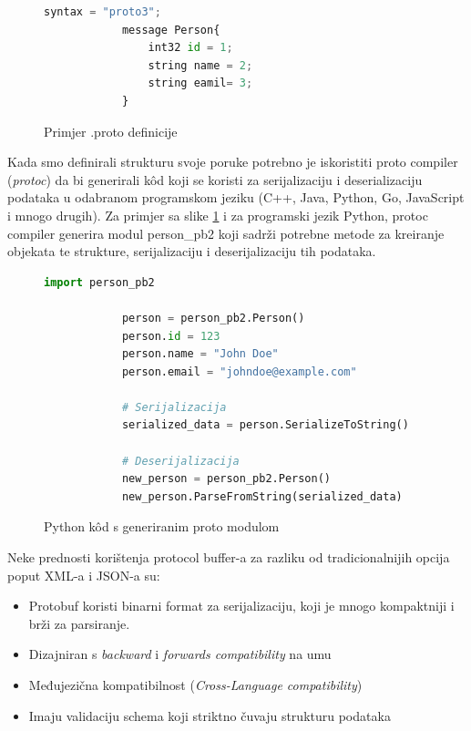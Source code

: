 \documentclass[zavrsnirad]{fer}
\begin{document}
\begin{figure}[H]
	\centering
	\begin{minipage}{0.6\linewidth}
		\begin{lstlisting}[language=Python]
			syntax = "proto3";
			message Person{
				int32 id = 1;
				string name = 2;
				string eamil= 3;
			}
		\end{lstlisting}
	\end{minipage}
	\caption{Primjer .proto definicije}
	\label{slk:proto}
\end{figure}		


Kada smo definirali strukturu svoje poruke potrebno je iskoristiti proto compiler (\textit{protoc}) da bi generirali k\^od koji se koristi za serijalizaciju i deserializaciju podataka u odabranom programskom jeziku (C++, Java, Python, Go, JavaScript i mnogo drugih). Za primjer sa slike \ref{slk:proto} i za programski jezik Python, protoc compiler generira modul person\_pb2 koji sadrži potrebne metode za kreiranje objekata te strukture, serijalizaciju i deserijalizaciju tih podataka. 

\begin{figure}[h]
	\centering
	\begin{minipage}{0.8\linewidth}
		\begin{lstlisting}[language=Python]
			import person_pb2
			
			person = person_pb2.Person()
			person.id = 123
			person.name = "John Doe"
			person.email = "johndoe@example.com"
			
			# Serijalizacija
			serialized_data = person.SerializeToString()
			
			# Deserijalizacija
			new_person = person_pb2.Person()
			new_person.ParseFromString(serialized_data)
		\end{lstlisting}
	\end{minipage}
	\caption{Python k\^od s generiranim proto modulom}
	\label{slk:proto_kod}
\end{figure}

Neke prednosti korištenja protocol buffer-a za razliku od tradicionalnijih opcija poput XML-a i JSON-a su:

\begin{itemize}
	\item Protobuf koristi binarni format za serijalizaciju, koji je mnogo kompaktniji i brži za parsiranje.
	\item Dizajniran s \textit{backward} i \textit{forwards compatibility} na umu 
	\item Međujezična kompatibilnost (\textit{Cross-Language compatibility})
	\item Imaju validaciju schema koji striktno čuvaju strukturu podataka
\end{itemize}
\end{document}
